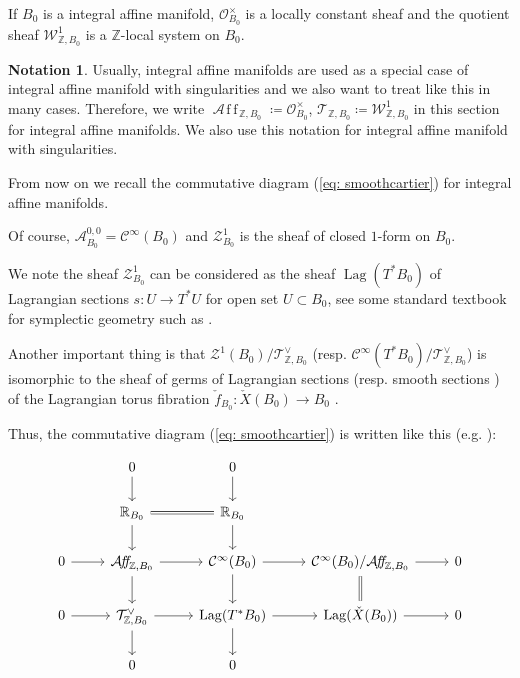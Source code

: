 \documentclass[a4paper,dvipdfmx,reqno,12pt]{amsart}
\theoremstyle{definition}
\newtheorem{Not}[Thm]{Notation}
\newcommand{\deq}{\coloneqq}
\newcommand{\Z}{\mathbb{Z}}%
\newcommand{\mb}[1]{\mathbb{#1}}%
\newcommand{\mcal}[1]{\mathcal{#1}}%
\newcommand{\opn}[1]{\operatorname{#1}}
\newcommand{\AffS}{{\mathop{\mcal{A}\!f\!\!f\!}\nolimits}}
\numberwithin{equation}{section}
\begin{document}
If $B_0$ is a integral affine manifold, 
$\mcal{O}^{\times}_{B_0}$ is a locally constant sheaf and the quotient sheaf $\mcal{W}^{1}_{\Z,B_0}$ is a $\Z$-local system on $B_0$.

\begin{Not}
  Usually, integral affine manifolds are used as a special case of integral affine manifold with singularities and we also want to treat like this in many cases.
  Therefore, we write $\AffS_{\Z,B_0}\deq \mcal{O}^{\times}_{B_0}$, $\mcal{T}_{\Z,B_0}\deq \mcal{W}_{\Z,B_0}^{1}$ in this section for integral affine manifolds. We also use this notation for integral affine manifold with singularities.
\end{Not}

From now on we recall the commutative diagram (\ref{eq: smoothcartier})
 for integral affine manifolds.

Of course, $\mcal{A}_{B_0}^{0,0}=\mcal{C}^{\infty}(B_0)$ and
 $\mcal{Z}^{1}_{B_0}$ is the sheaf of closed $1$-form on $B_0$.



We note the sheaf $\mcal{Z}^{1}_{B_0}$ can be considered as the sheaf 
$\opn{Lag}(T^{*}B_0)$ of Lagrangian sections 
$s:U \to T^{*}U$ for open set $U \subset B_0$, 
see some standard textbook for symplectic geometry 
such as \cite[3.2]{MR1853077}.

Another important thing is that 
$\mcal{Z}^{1}(B_0)/\mcal{T}_{\Z,B_0}^{\vee}$
 (resp. $\mcal{C}^{\infty}(T^{*}B_0)/\mcal{T}_{\Z,B_0}^{\vee}$) 
is isomorphic to the sheaf of germs of Lagrangian sections 
(resp. smooth sections ) of the Lagrangian torus fibration 
$\check{f}_{B_0}\colon \check{X}(B_0)\to B_0$ 
\cite[(2.7), (2.11)]{duistermaatGlobalActionangleCoordinates1980a}.


Thus, the commutative diagram (\ref{eq: smoothcartier}) is written like this 
(e.g. \cite[p.468]{aspinwallDirichletBranesMirror2009}):

\begin{equation} \label{eq:affinecartier}
  \begin{tikzcd}
    & 0 \arrow[d]    & 0 \arrow[d]           &                      &   \\
    & \mb{R}_{B_0} \arrow[r,equal] \arrow[d]                & \mb{R}_{B_0} \arrow[d]           &                      &   \\
    0 \arrow[r] & \AffS_{\Z,B_0} \arrow[r] \arrow[d]         & \mcal{C}^{\infty}(B_0) \arrow[r] \arrow[d] & \mcal{C}^{\infty}(B_0)/\AffS_{\Z,B_0}  \arrow[r] \arrow[d,equal] & 0 \\
    0 \arrow[r] & \mcal{T}_{\Z,B_0}^{\vee} \arrow[r] \arrow[d] & \opn{Lag}(T^{*}B_0) \arrow[r] \arrow[d]  & \opn{Lag}(\check{X}(B_0)) \arrow[r]   & 0 \\
    & 0 & 0 &  &
  \end{tikzcd}
\end{equation}
\end{document}
